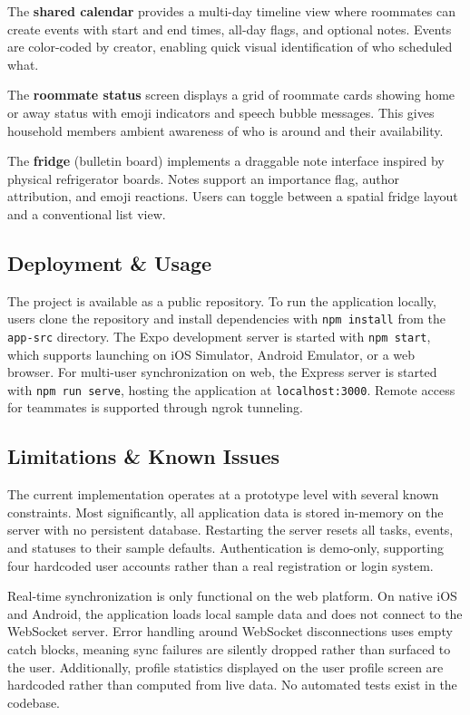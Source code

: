 \documentclass[sigconf]{acmart}
\begin{document}
The \textbf{shared calendar} provides a multi-day timeline view where roommates can create events with start and end times, all-day flags, and optional notes. Events are color-coded by creator, enabling quick visual identification of who scheduled what.

The \textbf{roommate status} screen displays a grid of roommate cards showing home or away status with emoji indicators and speech bubble messages. This gives household members ambient awareness of who is around and their availability.

The \textbf{fridge} (bulletin board) implements a draggable note interface inspired by physical refrigerator boards. Notes support an importance flag, author attribution, and emoji reactions. Users can toggle between a spatial fridge layout and a conventional list view.

\subsection{Deployment \& Usage}
The project is available as a public repository. To run the application locally, users clone the repository and install dependencies with \texttt{npm install} from the \texttt{app-src} directory. The Expo development server is started with \texttt{npm start}, which supports launching on iOS Simulator, Android Emulator, or a web browser. For multi-user synchronization on web, the Express server is started with \texttt{npm run serve}, hosting the application at \texttt{localhost:3000}. Remote access for teammates is supported through ngrok tunneling.

\subsection{Limitations \& Known Issues}
The current implementation operates at a prototype level with several known constraints. Most significantly, all application data is stored in-memory on the server with no persistent database. Restarting the server resets all tasks, events, and statuses to their sample defaults. Authentication is demo-only, supporting four hardcoded user accounts rather than a real registration or login system.

Real-time synchronization is only functional on the web platform. On native iOS and Android, the application loads local sample data and does not connect to the WebSocket server. Error handling around WebSocket disconnections uses empty catch blocks, meaning sync failures are silently dropped rather than surfaced to the user. Additionally, profile statistics displayed on the user profile screen are hardcoded rather than computed from live data. No automated tests exist in the codebase.
\end{document}
